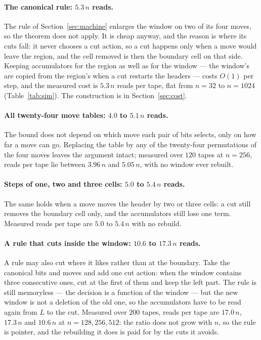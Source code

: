 \documentclass[11pt]{article}
\begin{document}
\paragraph{The canonical rule: $5.3\,n$ reads.} The rule of Section~\ref{sec:machine} enlarges the window
on two of its four moves, so the theorem does not apply. It is cheap anyway, and the reason is where
its cuts fall: it never chooses a cut action, so a cut happens only when a move would leave the
region, and the cell removed is then the boundary cell on that side. Keeping accumulators for the
region as well as for the window --- the window's are copied from the region's when a cut restarts the
headers --- costs $O(1)$ per step, and the measured cost is $5.3\,n$ reads per tape, flat from $n=32$
to $n=1024$ (Table~\ref{tab:sim}). The construction is in Section~\ref{sec:cost}.

\paragraph{All twenty-four move tables: $4.0$ to $5.1\,n$ reads.} The bound does not depend on which move
each pair of bits selects, only on how far a move can go. Replacing the table by any of the twenty-four
permutations of the four moves leaves the argument intact; measured over $120$ tapes at $n=256$, reads
per tape lie between $3.96\,n$ and $5.05\,n$, with no window ever rebuilt.

\paragraph{Steps of one, two and three cells: $5.0$ to $5.4\,n$ reads.} The same holds when a move moves
the header by two or three cells: a cut still removes the boundary cell only, and the accumulators still
lose one term. Measured reads per tape are $5.0$ to $5.4\,n$ with no rebuild.

\paragraph{A rule that cuts inside the window: $10.6$ to $17.3\,n$ reads.} A rule may also cut where it likes
rather than at the boundary. Take the canonical bits and moves and add one cut action: when the window
contains three consecutive ones, cut at the first of them and keep the left part. The rule is still
memoryless --- the decision is a function of the window --- but the new window is not a deletion of the
old one, so the accumulators have to be read again from $L$ to the cut. Measured over $200$ tapes, reads
per tape are $17.0\,n$, $17.3\,n$ and $10.6\,n$ at $n=128,256,512$: the ratio does not grow with $n$, so
the rule is pointer, and the rebuilding it does is paid for by the cuts it avoids.
\end{document}
